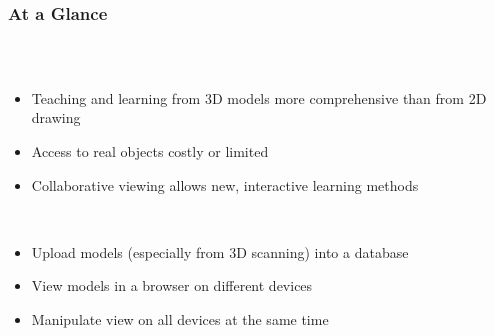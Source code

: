 \begin{frame}
  \frametitle{At a Glance}
  \begin{columns}
    \begin{column}{0.8\textwidth}
      \begin{description}[]
        \item[Why Collaborative 3D Model Viewing?] \hfill \\
        \begin{itemize}
          \item Teaching and learning from 3D models more comprehensive than from 2D drawing
          \item Access to real objects costly or limited
          \item Collaborative viewing allows new, interactive learning methods
        \end{itemize}

        \bigskip
        \item[Our Approach] \hfill \\
          \begin{itemize}
            \item Upload models (especially from 3D scanning) into a database
            \item View models in a browser on different devices
            \item Manipulate view on all devices at the same time
        \end{itemize}
      \end{description}
    \end{column}


\end{columns}
\end{frame}
